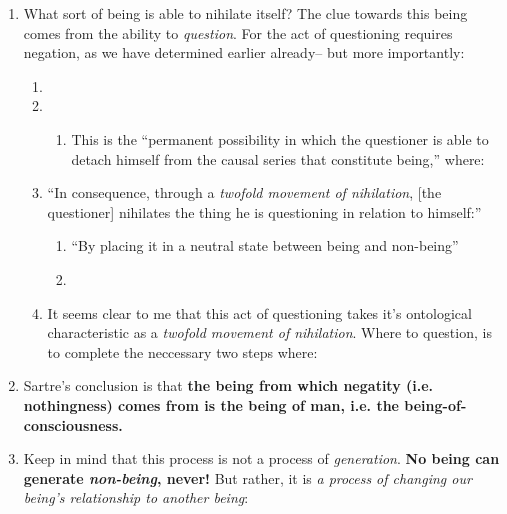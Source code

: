 \begin{enumerate}
\begin{enumerate}
  \end{enumerate}
  \item What sort of being is able to nihilate itself? The clue towards this being comes from the ability to \emph{question}. For the act of questioning requires negation, as we have determined earlier already-- but more importantly:
  \begin{enumerate}
    \item {}
    \item {}
    \begin{enumerate}
      \item This is the \enquote{permanent possibility in which the questioner is able to detach himself from the causal series that constitute being,} where:
    \end{enumerate}
    \item \enquote{In consequence, through a \emph{twofold movement of nihilation}, [the questioner] nihilates the thing he is questioning in relation to himself:}
    \begin{enumerate}
      \item \enquote{By placing it in a neutral state between being and non-being}
      \item {}
    \end{enumerate}
    \item It seems clear to me that this act of questioning takes it's ontological characteristic as a \emph{twofold movement of nihilation}. Where to question, is to complete the neccessary two steps where:
  \end{enumerate}
  \item Sartre's conclusion is that \textbf{the being from which negatity (i.e. nothingness) comes from is the being of man, i.e. the being-of-consciousness.}
  \item Keep in mind that this process is not a process of \emph{generation}. \textbf{No being can generate \emph{non-being}, never!} But rather, it is \emph{a process of changing our being's relationship to another being}:

\end{enumerate}
